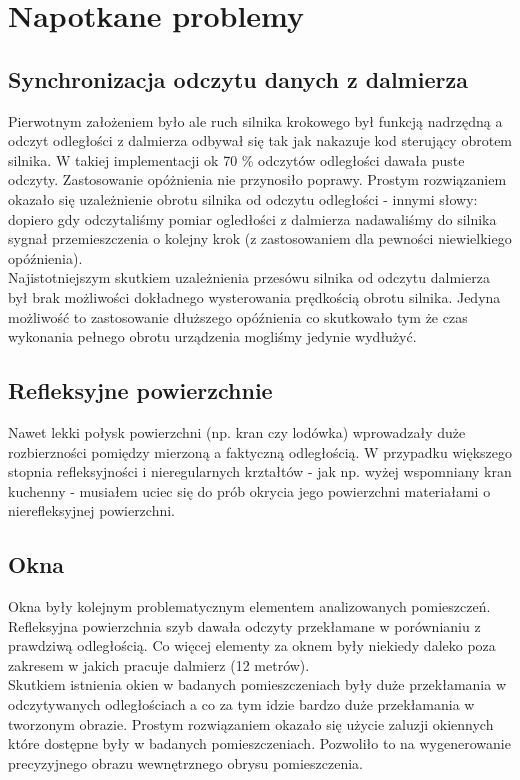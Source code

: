 \section {Napotkane problemy}
\subsection {Synchronizacja odczytu danych z dalmierza}
Pierwotnym założeniem było ale ruch silnika krokowego był funkcją nadrzędną a odczyt odległości z dalmierza odbywał się tak jak nakazuje kod sterujący obrotem silnika. W takiej implementacji ok 70 \% odczytów odległości dawała puste odczyty. Zastosowanie opóżnienia nie przynosiło poprawy. Prostym rozwiązaniem okazało się uzależnienie obrotu silnika od odczytu odległości - innymi słowy: dopiero gdy odczytaliśmy pomiar ogledłości z dalmierza nadawaliśmy do silnika sygnał przemieszczenia o kolejny krok (z zastosowaniem dla pewności niewielkiego opóźnienia).\\

Najistotniejszym skutkiem uzależnienia przesówu silnika od odczytu dalmierza był brak możliwości dokładnego wysterowania prędkością obrotu silnika. Jedyna możliwość to zastosowanie dłuższego opóźnienia co skutkowało tym że czas wykonania pełnego obrotu urządzenia mogliśmy jedynie wydłużyć. 

\subsection {Refleksyjne powierzchnie}
Nawet lekki połysk powierzchni (np. kran czy lodówka) wprowadzały duże rozbierzności pomiędzy mierzoną a faktyczną odległością. W przypadku większego stopnia refleksyjności i nieregularnych krztałtów - jak np. wyżej wspomniany kran kuchenny - musiałem uciec się do prób okrycia jego powierzchni materiałami o nierefleksyjnej powierzchni.

\subsection {Okna}
Okna były kolejnym problematycznym elementem analizowanych pomieszczeń. Refleksyjna powierzchnia szyb dawała odczyty przekłamane w porównianiu z prawdziwą odległością. Co więcej elementy za oknem były niekiedy daleko poza zakresem w jakich pracuje dalmierz (12 metrów).\\

Skutkiem istnienia okien w badanych pomieszczeniach były duże przekłamania w odczytywanych odległościach a co za tym idzie bardzo duże przekłamania w tworzonym obrazie. Prostym rozwiązaniem okazało się użycie zaluzji okiennych które dostępne były w  badanych pomieszczeniach. Pozwoliło to na wygenerowanie precyzyjnego obrazu wewnętrznego obrysu pomieszczenia.

